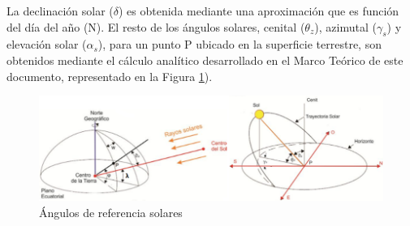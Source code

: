 
%

La declinación solar ($\delta$) es obtenida mediante una aproximación que es función del día del año (N). El resto de los ángulos solares, cenital ($\theta _z$), azimutal ($\gamma _s$) y elevación solar ($\alpha _s$), para un punto P ubicado en la superficie terrestre, son obtenidos mediante el cálculo analítico desarrollado en el Marco Teórico de este documento, representado en la Figura \ref{fig:angulossolares}).

\begin{figure}[H]
	\centering
	\includegraphics[width=\columnwidth]{imagenes/angulossolares}
	\caption{Ángulos de referencia solares \cite{DDC3}}
	\label{fig:angulossolares}
\end{figure}

